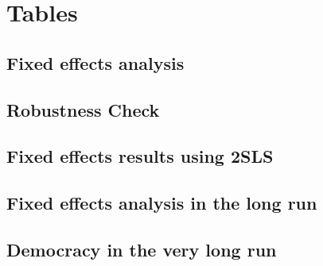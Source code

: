 \documentclass[11pt, a4paper, leqno]{article}
\begin{document}
\clearpage

\section{Tables}

\subsection{Fixed effects analysis}




\clearpage

\subsection{Robustness Check}




\clearpage


\subsection{Fixed effects results using 2SLS}





\clearpage





\clearpage

\subsection{Fixed effects analysis in the long run}



\clearpage

\subsection{Democracy in the very long run}





\clearpage
{}
\printbibliography
{}

\end{document}
